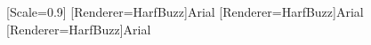 
\ifLuaTeX
  \usepackage{fontspec}
  \setmainfont{Latin Modern Roman}
  \setsansfont{Latin Modern Sans}
  \setmonofont{Consolas}[Scale=0.9] %
  [Renderer=HarfBuzz]{Arial} %
  [Renderer=HarfBuzz]{Arial}
  [Renderer=HarfBuzz]{Arial}
\else
  \usepackage{lmodern}
\fi

\newcommand{\HeadingFont}{\sffamily}


\setlength{\parindent}{0pt}
\setlength{\parskip}{6pt plus 2pt minus 1pt}
